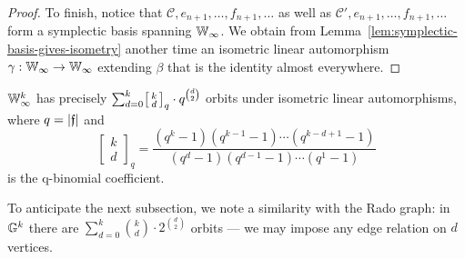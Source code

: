 \begin{proof}
    To finish, notice that $\mathcal{C}, e_{n+1}, \ldots, f_{n+1}, \ldots$ as well as $\mathcal{C}', e_{n+1}, \ldots, f_{n+1}, \ldots$ 
    form a symplectic basis spanning $\mathbb{W}_\infty$.
    We obtain from Lemma~\ref{lem:symplectic-basis-gives-isometry} another time an isometric linear automorphism $\gamma : \mathbb{W}_\infty \to \mathbb{W}_\infty$ extending $\beta$ 
    that is the identity almost everywhere.
\end{proof}


\begin{proposition}\label{prop:symplectic-oligomorphic}
    $\mathbb{W}_\infty^k$ has precisely \(
        \sum_{d = 0}^k \begin{bsmallmatrix}k \\ d \end{bsmallmatrix}_q \cdot q^{\binom{d}{2}}
    \) orbits under isometric linear automorphisms,
    where $q = \vert \mathfrak{f} \vert$ and \[
        \begin{bmatrix}k \\ d \end{bmatrix}_q 
        = \frac{
            (q^k - 1)(q^{k-1} - 1) \cdots (q^{k-d+1} - 1)
        }{
            (q^d - 1) (q^{d-1} - 1) \cdots (q^1 - 1)
        }
    \] is the q-binomial coefficient.
\end{proposition}
\begin{remark}
    To anticipate the next subsection, we note a similarity with the Rado graph: 
    in $\mathbb{G}^k$ there are $\sum_{d=0}^k \binom{k}{d} \cdot 2^{\binom{d}{2}}$ orbits 
    --- we may impose any edge relation on $d$ vertices.
\end{remark}

